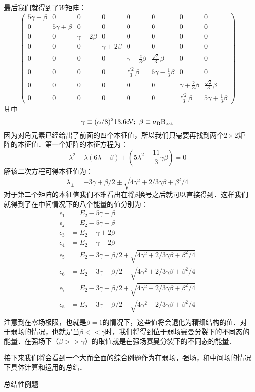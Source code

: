 最后我们就得到了$W$矩阵：
\begin{equation}
\begin{pmatrix}
5\gamma -\beta & 0 & 0 & 0 & 0 & 0 & 0 & 0\\
 0 & 5\gamma +\beta  & 0 & 0 & 0 & 0 & 0 & 0\\
 0 & 0 & \gamma-2\beta & 0 & 0 & 0 & 0 & 0\\
 0 & 0 & 0 & \gamma+2\beta & 0 & 0 & 0 & 0\\
 0 & 0 & 0 & 0 & \gamma-\frac{2}{3}\beta & \frac{\sqrt{2}}{3}\beta& 0 & 0\\
 0 & 0 & 0 & 0 & \frac{\sqrt{2}}{3}\beta & 5\gamma -\frac{1}{3}\beta & 0 & 0\\
 0 & 0 & 0 & 0 & 0 & 0 & \gamma+\frac{2}{3}\beta &\frac{\sqrt{2}}{3}\beta \\
 0 & 0 & 0 & 0 & 0 & 0 & \frac{\sqrt{2}}{3}\beta & 5\gamma +\frac{1}{3}\beta
\end{pmatrix}
\end{equation}
其中
\begin{equation}
\gamma\equiv(\alpha/8)^2 13.6\rm{eV}; \ \beta\equiv\mu_B B_{\rm{ext}}
\end{equation}
因为对角元素已经给出了前面的四个本征值，所以我们只需要再找到两个$2\times2$矩阵的本征值．第一个矩阵的本征方程为：
\begin{equation}
\lambda^2-\lambda(6\lambda-\beta)+(5\lambda^2-\frac{11}{3}\gamma\beta)=0
\end{equation}
解该二次方程可得本征值为：
\begin{equation}
\lambda_\pm = -3\gamma +\beta/2\pm \sqrt{4\gamma^2+2/3\gamma\beta+\beta^2/4}
\end{equation}
对于第二个矩阵的本征值我们不难看出在将$\beta$换号之后就可以直接得到．这样我们就得到了在中间情况下的八个能量的值分别为：
\begin{align}
\epsilon_1 &= E_2-5\gamma+\beta\\
\epsilon_2 &= E_2-5\gamma+\beta\\
\epsilon_3 &= E_2-\gamma+2\beta\\
\epsilon_4 &= E_2-\gamma-2\beta\\
\epsilon_5 &= E_2-3\gamma +\beta/2+\sqrt{4\gamma^2+2/3\gamma\beta+\beta^2/4}\\
\epsilon_6 &= E_2-3\gamma +\beta/2-\sqrt{4\gamma^2+2/3\gamma\beta+\beta^2/4}\\
\epsilon_7 &= E_2-3\gamma -\beta/2+\sqrt{4\gamma^2-2/3\gamma\beta+\beta^2/4}\\
\epsilon_8 &= E_2-3\gamma -\beta/2-\sqrt{4\gamma^2-2/3\gamma\beta+\beta^2/4}\\
\end{align}
注意到在零场极限，也就是$\beta=0$的情况下，这些值将会退化为精细结构的值．对于弱场的情况，也就是当$\beta<<\gamma$时，我们将得到位于弱场赛曼分裂下的不同态的能量．在强场下（$\beta>>\gamma$）的取值就是在强场赛曼分裂下的不同态的能量．

接下来我们将会看到一个大而全面的综合例题作为在弱场，强场，和中间场的情况下具体计算和运用的总结．
\begin{example}{总结性例题}

\end{example}
 



